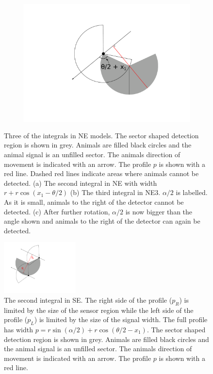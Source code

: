 \begin{figure}[t]
\begin{subfigure}[t]{0.3\textwidth}
                       \includegraphics[width=1\textwidth, trim=5cm 1cm 4cm 1cm]{imgs/ne34.pdf}
                \caption{}
                \label{f:NE3fourth}
        \end{subfigure}

\caption{Three of the integrals in NE models. The sector shaped detection region is shown in grey. Animals are filled black circles and the animal signal is an unfilled sector. The animals direction of movement is indicated with an arrow. The profile $p$ is shown with a red line. Dashed red lines indicate areas where animals cannot be detected. (a) The second integral in NE with width $r + r\cos(x_1 - \theta/2)$ (b) The third integral in NE3. $\alpha/2$ is labelled. As it is small, animals to the right of the detector cannot be detected. (c) After further rotation, $\alpha/2$ is now bigger than the angle shown and animals to the right of the detector can again be detected.}
\label{f:NE}
\end{figure}


\begin{figure}[t]
        \centering
        \includegraphics[width=0.35\textwidth, trim=1cm 4cm 9cm 1cm]{imgs/se3.pdf}
\caption{The second integral in SE. The right side of the profile ($p_R$) is limited by the size of the sensor region  while the left side of the profile ($p_L$) is limited by the size of the signal width. The full profile has width $p = r\sin(\alpha/2) +r\cos(\theta/2-x_1)$. The sector shaped detection region is shown in grey. Animals are filled black circles and the animal signal is an unfilled sector. The animals direction of movement is indicated with an arrow. The profile $p$ is shown with a red line.   }
\label{f:se3}
\end{figure}


